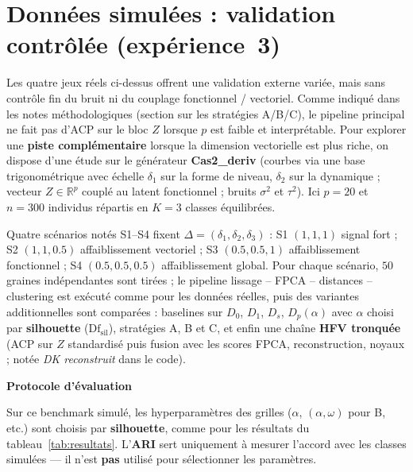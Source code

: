 \documentclass[11pt, a4paper]{article}
\newcommand{\R}{\mathbb{R}}
\newcommand{\Dp}{D_p}
\newenvironment{keybox}[1][]{%
  \def\FrameCommand{\fboxsep=8pt \fcolorbox{emphborder}{emphbox}}%
  \MakeFramed{\advance\hsize-\width \FrameRestore}%
  \noindent\textbf{#1}\par\smallskip\noindent\ignorespaces
}{\endMakeFramed}
\begin{document}
\section{Données simulées : validation contrôlée (expérience~3)}
\label{sec:exp3}

Les quatre jeux réels ci-dessus offrent une validation externe variée, mais
sans contrôle fin du bruit ni du couplage fonctionnel / vectoriel. Comme
indiqué dans les notes méthodologiques (section sur les stratégies A/B/C), le
pipeline principal ne fait pas d'ACP sur le bloc $Z$ lorsque $p$ est faible et
interprétable. Pour explorer une \textbf{piste complémentaire} lorsque la
dimension vectorielle est plus riche, on dispose d'une étude sur le
générateur \textbf{Cas2\_deriv} (courbes via une base trigonométrique avec
échelle $\delta_1$ sur la forme de niveau, $\delta_2$ sur la dynamique ;
vecteur $Z \in \R^p$ couplé au latent fonctionnel ; bruits $\sigma^2$ et
$\tau^2$). Ici $p = 20$ et $n = 300$ individus répartis en $K = 3$ classes
équilibrées.

Quatre scénarios notés S1--S4 fixent
$\Delta = (\delta_1, \delta_2, \delta_3)$ : S1 $(1,1,1)$ signal fort ;
S2 $(1,1,0.5)$ affaiblissement vectoriel ; S3 $(0.5,0.5,1)$ affaiblissement
fonctionnel ; S4 $(0.5,0.5,0.5)$ affaiblissement global. Pour chaque
scénario, $50$ graines indépendantes sont tirées ; le pipeline lissage --
FPCA -- distances -- clustering est exécuté comme pour les données réelles,
puis des variantes additionnelles sont comparées : baselines sur $D_0$,
$D_1$, $D_s$, $\Dp(\alpha)$ avec $\alpha$ choisi par \textbf{silhouette}
($\mathrm{Df}_{\mathrm{sil}}$), stratégies A, B et C, et enfin une chaîne
\textbf{HFV tronquée} (ACP sur $Z$ standardisé puis fusion avec les scores
FPCA, reconstruction, noyaux ; notée \emph{DK reconstruit} dans le code).

\begin{keybox}[Protocole d'évaluation]
Sur ce benchmark simulé, les hyperparamètres des grilles ($\alpha$,
$(\alpha,\omega)$ pour B, etc.) sont choisis par \textbf{silhouette},
comme pour les résultats du tableau~\ref{tab:resultats}. L'\textbf{ARI}
sert uniquement à mesurer l'accord avec les classes simulées — il n'est
\textbf{pas} utilisé pour sélectionner les paramètres.
\end{keybox}
\end{document}
